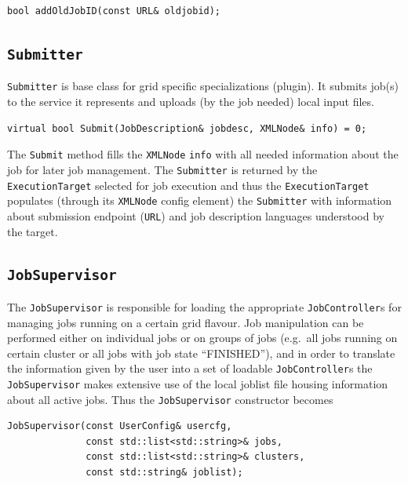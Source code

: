 \documentclass{book}
\newcommand{\ExecutionTarget}{\texttt{ExecutionTarget}}
\newcommand{\JobController}{\texttt{JobController}}
\newcommand{\JobSupervisor}{\texttt{JobSupervisor}}
\newcommand{\Submitter}{\texttt{Submitter}}
\newcommand{\URL}{\texttt{URL}}
\newcommand{\XMLNode}{\texttt{XMLNode}}
\begin{document}
\begin{shaded}
\begin{verbatim}
bool addOldJobID(const URL& oldjobid);
\end{verbatim}
\end{shaded}

\subsection{{\Submitter}}

{\Submitter} is base class for grid specific specializations (plugin).
It submits job(s) to the service it represents and uploads (by the job
needed) local input files.

\begin{shaded}
\begin{verbatim}
virtual bool Submit(JobDescription& jobdesc, XMLNode& info) = 0;
\end{verbatim}
\end{shaded}

The \texttt{Submit} method fills the {\XMLNode} \texttt{info} with all
needed information about the job for later job management. The
{\Submitter} is returned by the {\ExecutionTarget} selected for job
execution and thus the {\ExecutionTarget} populates (through its
{\XMLNode} config element) the {\Submitter} with information about
submission endpoint ({\URL}) and job description languages understood
by the target.

\subsection{{\JobSupervisor}}

The {\JobSupervisor} is responsible for loading the appropriate
{\JobController}s for managing jobs running on a certain grid
flavour. Job manipulation can be performed either on individual jobs
or on groups of jobs (e.g.\ all jobs running on certain cluster or all
jobs with job state ``FINISHED''), and in order to translate the
information given by the user into a set of loadable {\JobController}s
the {\JobSupervisor} makes extensive use of the local joblist file
housing information about all active jobs. Thus the {\JobSupervisor}
constructor becomes

\begin{shaded}
\begin{verbatim}
JobSupervisor(const UserConfig& usercfg,
              const std::list<std::string>& jobs,
              const std::list<std::string>& clusters,
              const std::string& joblist);
\end{verbatim}
\end{shaded}
\end{document}
